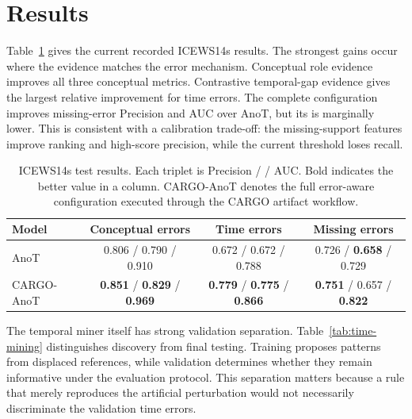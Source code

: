 \section{Results}

Table~\ref{tab:main-results} gives the current recorded ICEWS14s results. The strongest gains occur where the evidence matches the error mechanism. Conceptual role evidence improves all three conceptual metrics. Contrastive temporal-gap evidence gives the largest relative improvement for time errors. The complete configuration improves missing-error Precision and AUC over AnoT, but its \fbeta is marginally lower. This is consistent with a calibration trade-off: the missing-support features improve ranking and high-score precision, while the current threshold loses recall.

\begin{table}[t]
\centering
\caption{ICEWS14s test results. Each triplet is Precision / \fbeta / AUC. Bold indicates the better value in a column. CARGO-AnoT denotes the full error-aware configuration executed through the CARGO artifact workflow.}
\label{tab:main-results}
\small
\begin{tabular}{lccc}
\toprule
Model & Conceptual errors & Time errors & Missing errors \\
\midrule
AnoT & 0.806 / 0.790 / 0.910 & 0.672 / 0.672 / 0.788 & 0.726 / \textbf{0.658} / 0.729 \\
CARGO-AnoT & \textbf{0.851} / \textbf{0.829} / \textbf{0.969} & \textbf{0.779} / \textbf{0.775} / \textbf{0.866} & \textbf{0.751} / 0.657 / \textbf{0.822} \\
\bottomrule
\end{tabular}
\end{table}

The temporal miner itself has strong validation separation. Table~\ref{tab:time-mining} distinguishes discovery from final testing. Training proposes patterns from displaced references, while validation determines whether they remain informative under the evaluation protocol. This separation matters because a rule that merely reproduces the artificial perturbation would not necessarily discriminate the validation time errors.

